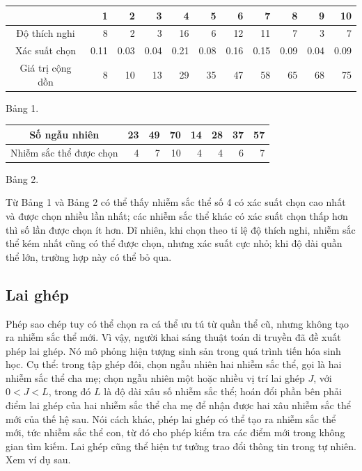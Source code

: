 \documentclass[11pt]{article}
\begin{document}
\begin{center}
\begin{tabular}{c|rrrrrrrrrr}
 & 1 & 2 & 3 & 4 & 5 & 6 & 7 & 8 & 9 & 10\\ \hline
Độ thích nghi & 8 & 2 & 3 & 16 & 6 & 12 & 11 & 7 & 3 & 7\\
Xác suất chọn & 0.11 & 0.03 & 0.04 & 0.21 & 0.08 & 0.16 & 0.15 & 0.09 & 0.04 & 0.09\\
Giá trị cộng dồn & 8 & 10 & 13 & 29 & 35 & 47 & 58 & 65 & 68 & 75
\end{tabular}

Bảng 1.
\end{center}

\begin{center}
\begin{tabular}{c|rrrrrrr}
Số ngẫu nhiên & 23 & 49 & 70 & 14 & 28 & 37 & 57\\ \hline
Nhiễm sắc thể được chọn & 4 & 7 & 10 & 4 & 4 & 6 & 7
\end{tabular}

Bảng 2.
\end{center}

Từ Bảng 1 và Bảng 2 có thể thấy nhiễm sắc thể số 4 có xác suất chọn cao nhất
và được chọn nhiều lần nhất; các nhiễm sắc thể khác có xác suất chọn thấp hơn
thì số lần được chọn ít hơn. Dĩ nhiên, khi chọn theo tỉ lệ độ thích nghi,
nhiễm sắc thể kém nhất cũng có thể được chọn, nhưng xác suất cực nhỏ; khi độ
dài quần thể lớn, trường hợp này có thể bỏ qua.

\subsection{Lai ghép}

Phép sao chép tuy có thể chọn ra cá thể ưu tú từ quần thể cũ, nhưng không
tạo ra nhiễm sắc thể mới. Vì vậy, người khai sáng thuật toán di truyền đã đề
xuất phép lai ghép. Nó mô phỏng hiện tượng sinh sản trong quá trình tiến hóa
sinh học. Cụ thể: trong tập ghép đôi, chọn ngẫu nhiên hai nhiễm sắc thể, gọi
là hai nhiễm sắc thể cha mẹ; chọn ngẫu nhiên một hoặc nhiều vị trí lai ghép
\(J\), với \(0<J<L\), trong đó \(L\) là độ dài xâu số nhiễm sắc thể; hoán đổi
phần bên phải điểm lai ghép của hai nhiễm sắc thể cha mẹ để nhận được hai
xâu nhiễm sắc thể mới của thế hệ sau. Nói cách khác, phép lai ghép có thể
tạo ra nhiễm sắc thể mới, tức nhiễm sắc thể con, từ đó cho phép kiểm tra các
điểm mới trong không gian tìm kiếm. Lai ghép cũng thể hiện tư tưởng trao đổi
thông tin trong tự nhiên. Xem ví dụ sau.
\end{document}
